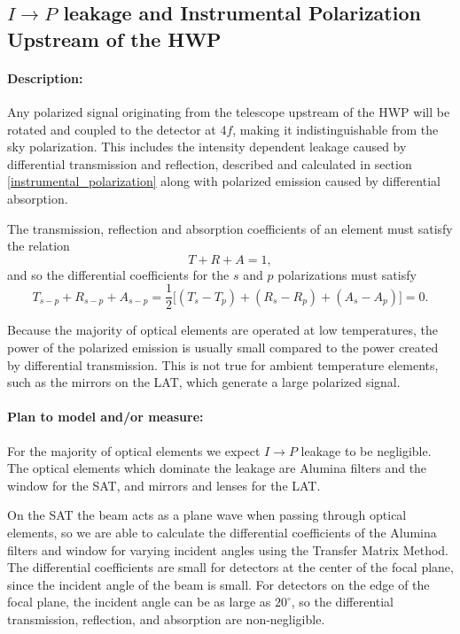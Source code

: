 
\subsection{$I\rightarrow P$ leakage and Instrumental Polarization Upstream of the HWP}
\label{IP upstream of HWP}

\paragraph{Description:}
Any polarized signal originating from the telescope upstream of the HWP will be rotated and coupled to the detector at 4$f$,
making it indistinguishable from the sky polarization.
This includes the intensity dependent leakage caused by differential transmission and reflection, described and calculated in section \ref{instrumental_polarization} 
along with polarized emission caused by differential absorption.

The transmission, reflection and absorption coefficients of an element must satisfy the relation
\begin{equation}
T + R + A = 1,
\end{equation}
and so the differential coefficients for the $s$ and $p$ polarizations must satisfy
\begin{equation}
T_{s - p} + R_{s-p} + A_{s-p}
= \frac{1}{2}\big[(T_s - T_p)  + (R_s - R_p) + (A_s - A_p)\big] = 0.
\end{equation}

Because the majority of optical elements are operated at low temperatures, 
the power of the polarized emission is usually small compared to the power created by differential transmission.
This is not true for ambient temperature elements, such as the mirrors on the LAT, which generate a large polarized signal. 

\paragraph{Plan to model and/or measure:}
For the majority of optical elements we expect $I\rightarrow P$ leakage to be negligible. The optical elements which dominate the leakage are Alumina filters and the window for the SAT, and mirrors and lenses for the LAT.

On the SAT the beam acts as a plane wave when passing through optical elements, so we are able to calculate the differential coefficients of the Alumina filters and window for varying incident angles using the Transfer Matrix Method.
The differential coefficients are small for detectors at the center of the focal plane, since the incident angle of the beam is small.
For detectors on the edge of the focal plane, the incident angle can be as large as $20^\circ$, so the differential transmission, reflection, and absorption are non-negligible.

